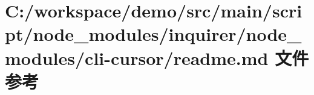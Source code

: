 \hypertarget{node__modules_2inquirer_2node__modules_2cli-cursor_2_r_e_a_d_m_e_8md}{}\section{C\+:/workspace/demo/src/main/script/node\+\_\+modules/inquirer/node\+\_\+modules/cli-\/cursor/readme.md 文件参考}
\label{node__modules_2inquirer_2node__modules_2cli-cursor_2_r_e_a_d_m_e_8md}
